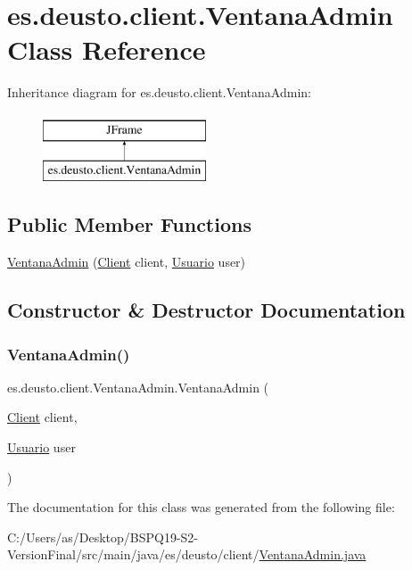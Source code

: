 \hypertarget{classes_1_1deusto_1_1client_1_1_ventana_admin}{}\section{es.\+deusto.\+client.\+Ventana\+Admin Class Reference}
\label{classes_1_1deusto_1_1client_1_1_ventana_admin}
Inheritance diagram for es.\+deusto.\+client.\+Ventana\+Admin\+:\begin{figure}[H]
\begin{center}
\leavevmode
\includegraphics[height=2.000000cm]{classes_1_1deusto_1_1client_1_1_ventana_admin}
\end{center}
\end{figure}
\subsection*{Public Member Functions}
\begin{DoxyCompactItemize}
\item 
\mbox{\hyperlink{classes_1_1deusto_1_1client_1_1_ventana_admin_a227953608a252f1fc239c3392163f3f4}{Ventana\+Admin}} (\mbox{\hyperlink{classes_1_1deusto_1_1client_1_1_client}{Client}} client, \mbox{\hyperlink{classes_1_1deusto_1_1server_1_1jdo_1_1_usuario}{Usuario}} user)
\end{DoxyCompactItemize}


\subsection{Constructor \& Destructor Documentation}
\mbox{\label{classes_1_1deusto_1_1client_1_1_ventana_admin_a227953608a252f1fc239c3392163f3f4}} 
\subsubsection{\texorpdfstring{VentanaAdmin()}{VentanaAdmin()}}
{\footnotesize\ttfamily es.\+deusto.\+client.\+Ventana\+Admin.\+Ventana\+Admin (\begin{DoxyParamCaption}\item[{\mbox{\hyperlink{classes_1_1deusto_1_1client_1_1_client}{Client}}}]{client,  }\item[{\mbox{\hyperlink{classes_1_1deusto_1_1server_1_1jdo_1_1_usuario}{Usuario}}}]{user }\end{DoxyParamCaption})}



The documentation for this class was generated from the following file\+:\begin{DoxyCompactItemize}
\item 
C\+:/\+Users/as/\+Desktop/\+B\+S\+P\+Q19-\/\+S2-\/\+Version\+Final/src/main/java/es/deusto/client/\mbox{\hyperlink{_ventana_admin_8java}{Ventana\+Admin.\+java}}\end{DoxyCompactItemize}
